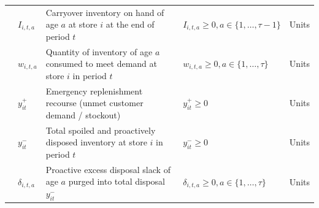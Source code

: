 \documentclass[11pt,a4paper]{article}
\theoremstyle{definition}
\theoremstyle{remark}
\begin{document}
\begin{table}[H]
{\begin{tabular}{@{}llp{8.5cm}ll@{}}
 & $I_{i,t,a}$ & Carryover inventory on hand of age $a$ at store $i$ at the end of period $t$ & $I_{i,t,a} \ge 0, a \in \{1, \dots, \tau-1\}$ & Units \\
 & $w_{i,t,a}$ & Quantity of inventory of age $a$ consumed to meet demand at store $i$ in period $t$ & $w_{i,t,a} \ge 0, a \in \{1, \dots, \tau\}$ & Units \\
 & $y_{it}^+$ & Emergency replenishment recourse (unmet customer demand / stockout) & $y_{it}^+ \ge 0$ & Units \\
 & $y_{it}^-$ & Total spoiled and proactively disposed inventory at store $i$ in period $t$ & $y_{it}^- \ge 0$ & Units \\
 & $\delta_{i,t,a}$ & Proactive excess disposal slack of age $a$ purged into total disposal $y_{it}^-$ & $\delta_{i,t,a} \ge 0, a \in \{1, \dots, \tau\}$ & Units \\
\bottomrule
\end{tabular}%
}
\end{table}
\end{document}
